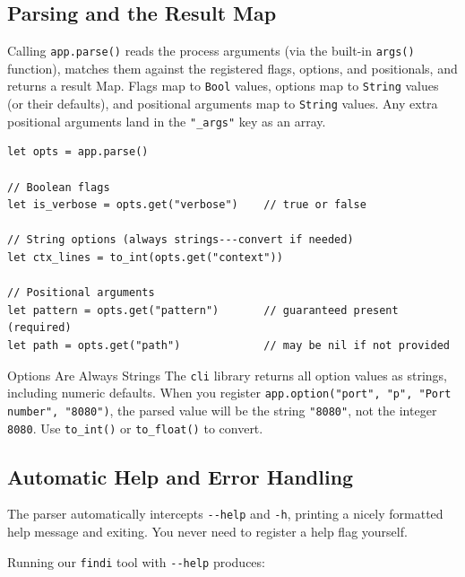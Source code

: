 \subsection{Parsing and the Result Map}\label{sec:cli-parsing}

Calling \lstinline|app.parse()| reads the process arguments (via the built-in \lstinline|args()| function), matches them against the registered flags, options, and positionals, and returns a result Map.
Flags map to \lstinline|Bool| values, options map to \lstinline|String| values (or their defaults), and positional arguments map to \lstinline|String| values.
Any extra positional arguments land in the \lstinline|"_args"| key as an array.

\begin{lstlisting}[language=Lattice, caption={Working with parsed results}]
let opts = app.parse()

// Boolean flags
let is_verbose = opts.get("verbose")    // true or false

// String options (always strings---convert if needed)
let ctx_lines = to_int(opts.get("context"))

// Positional arguments
let pattern = opts.get("pattern")       // guaranteed present (required)
let path = opts.get("path")             // may be nil if not provided
\end{lstlisting}

\begin{warnbox}{Options Are Always Strings}
The \lstinline|cli| library returns all option values as strings, including numeric defaults.
When you register \lstinline|app.option("port", "p", "Port number", "8080")|, the parsed value will be the string \lstinline|"8080"|, not the integer \lstinline|8080|.
Use \lstinline|to_int()| or \lstinline|to_float()| to convert.
\end{warnbox}

\subsection{Automatic Help and Error Handling}\label{sec:cli-help-errors}


The parser automatically intercepts \texttt{-{}-help} and \texttt{-h}, printing a nicely formatted help message and exiting.
You never need to register a help flag yourself.

Running our \texttt{findi} tool with \texttt{-{}-help} produces:

